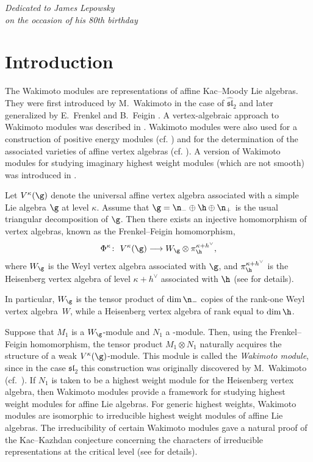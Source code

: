 \documentclass[pdftex]{sigma}
\numberwithin{equation}{section}
\theoremstyle{definition}
\newcommand{\1}{\textbf{1}}
\begin{document}
\begin{flushright}
\begin{minipage}{60mm}
\it Dedicated to James Lepowsky\\
 on the occasion of his 80th birthday
\end{minipage}
\end{flushright}

\renewcommand{\thefootnote}{\arabic{footnote}}
\setcounter{footnote}{0}

\section{Introduction}

The Wakimoto modules are representations of affine Kac--Moody Lie algebras.
They were first introduced by M.~Wakimoto \cite{Wak} in the case of $\widehat{\mathfrak{sl}}_{2}$
and later generalized by E.~Frenkel and B.~Feigin \cite{FF,FF2,FF1}.
A vertex-algebraic approach to Wakimoto modules was described in \cite{efren}.
 Wakimoto modules were also used for a construction of positive energy modules (cf. \cite{FK}) and for the determination of the associated varieties of affine vertex algebras (cf. \cite{AFK}). A version of Wakimoto modules for studying imaginary highest weight modules (which are not smooth) was introduced in \cite{CF, CF2}.

Let $V^{\kappa}(\g)$ denote the universal affine vertex algebra associated with a simple Lie algebra $\g$ at level $\kappa$.
Assume that $\g = {\n}_{-} \oplus {\h} \oplus {\n}_{+}$ is the usual triangular decomposition of $\g$.
Then there exists an injective homomorphism of vertex algebras, known as the Frenkel--Feigin homomorphism,
\[
 \Phi^{\kappa} \colon \ V^{\kappa}(\g) \longrightarrow W_{\g} \otimes \pi_{\h}^{\kappa + h^{\vee}},
\]
where $W_{\g}$ is the Weyl vertex algebra associated with $\g$, and
$\pi_{\h}^{\kappa + h^{\vee}}$ is the Heisenberg vertex algebra of level $\kappa + h^{\vee}$ associated with $\h$
(see \cite{efren} for details).

In particular, $W_{\g}$ is the tensor product of $\dim \n_{-}$ copies of the rank-one Weyl vertex al\-gebra~$W$,
while  a Heisenberg vertex algebra of rank equal to $\dim \h$.

Suppose that $M_1$ is a $W_{\g}$-module and $N_1$ a
-module.
Then, using the Frenkel--Feigin homomorphism, the tensor product $M_1 \otimes N_1$ naturally acquires the structure of a weak $V^{\kappa}(\g)$-module.
This module is called the \emph{Wakimoto module}, since in the case $\mathfrak{sl}_2$ this construction was originally discovered by M.~Wakimoto (cf.~\cite{Wak}).
If $N_1$ is taken to be a highest weight module for the Heisenberg vertex algebra, then Wakimoto modules provide a framework for studying highest weight modules for affine Lie algebras.
For generic highest weights, Wakimoto modules are isomorphic to irreducible highest weight modules of affine Lie algebras.
The irreducibility of certain Wakimoto modules gave a natural proof of the Kac--Kazhdan conjecture \cite{KK} concerning the characters of irreducible representations at the critical level
(see \cite[Section~4]{efren} for details).
\end{document}
